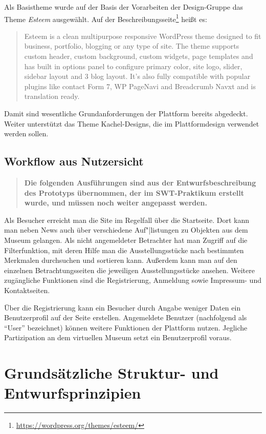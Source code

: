 \documentclass[a4paper,11pt]{article}
\begin{document}
Als Basistheme wurde auf der Basis der Vorarbeiten der Design-Gruppe das Theme
\emph{Esteem} ausgewählt.  Auf der
Beschreibungsseite\footnote{\url{https://wordpress.org/themes/esteem/}} heißt
es:
\begin{quote}
  Esteem is a clean multipurpose responsive WordPress theme designed to fit
  business, portfolio, blogging or any type of site. The theme supports custom
  header, custom background, custom widgets, page templates and has built in
  options panel to configure primary color, site logo, slider, sidebar layout
  and 3 blog layout. It's also fully compatible with popular plugins like
  contact Form 7, WP PageNavi and Breadcrumb Navxt and is translation
  ready. 
\end{quote}
Damit sind wesentliche Grundanforderungen der Plattform bereits abgedeckt.
Weiter unterstützt das Theme Kachel-Designs, die im Plattformdesign verwendet
werden sollen. 

\subsection{Workflow aus Nutzersicht}

\begin{quote}\bf
  Die folgenden Ausführungen sind aus der Entwurfsbeschreibung des Prototyps
  übernommen, der im SWT-Praktikum erstellt wurde, und müssen noch weiter
  angepasst werden.
\end{quote}
  
Als Besucher erreicht man die Site im Regelfall über die Startseite. Dort kann
man neben News auch über verschiedene Auf"|listungen zu Objekten aus dem
Museum gelangen. Als nicht angemeldeter Betrachter hat man Zugriff auf die
Filterfunktion, mit deren Hilfe man die Ausstellungsstücke nach bestimmten
Merkmalen durchsuchen und sortieren kann. Außerdem kann man auf den einzelnen
Betrachtungsseiten die jeweiligen Ausstellungsstücke ansehen. Weitere
zugängliche Funktionen sind die Registrierung, Anmeldung sowie Impressum- und
Kontaktseiten.
 
Über die Registrierung kann ein Besucher durch Angabe weniger Daten ein
Benutzerprofil auf der Seite erstellen. Angemeldete Benutzer (nachfolgend als
“User” bezeichnet) können weitere Funktionen der Plattform nutzen. Jegliche
Partizipation an dem virtuellen Museum setzt ein Benutzerprofil voraus.

\section{Grundsätzliche Struktur- und Entwurfsprinzipien}
 
\end{document}
